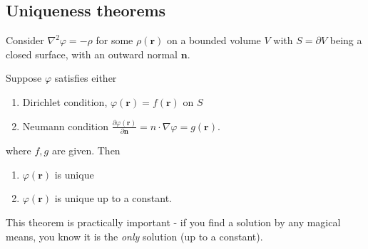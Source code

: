 \documentclass[a4paper]{article}
\begin{document}
\subsection{Uniqueness theorems}
\begin{thm}
  Consider $\nabla^2 \varphi = - \rho$ for some $\rho (\mathbf{r})$ on a bounded volume $V$ with $S = \partial V$ being a closed surface, with an outward normal $\mathbf{n}$.

  Suppose $\varphi$ satisfies either
  \begin{enumerate}
    \item Dirichlet condition, $\varphi(\mathbf{r}) = f(\mathbf{r})$ on $S$
    \item Neumann condition $\frac{\partial \varphi(\mathbf{r})}{\partial \mathbf{n}} = n\cdot \nabla \varphi = g(\mathbf{r})$.
  \end{enumerate}
  where $f, g$ are given. Then
  \begin{enumerate}
    \item $\varphi(\mathbf{r})$ is unique
    \item $\varphi(\mathbf{r})$ is unique up to a constant.
  \end{enumerate}
\end{thm}
This theorem is practically important - if you find a solution by any magical means, you know it is the \emph{only} solution (up to a constant).
\end{document}
